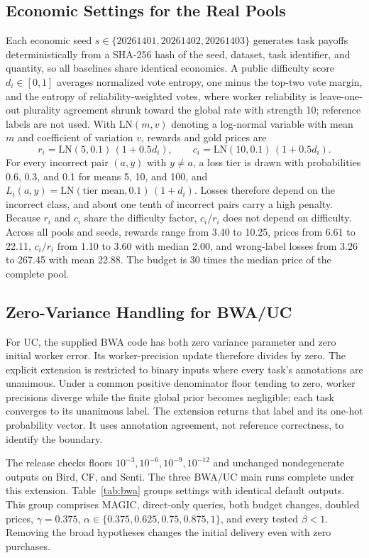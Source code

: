 \documentclass[journal]{IEEEtran}
\begin{document}
\subsection{Economic Settings for the Real Pools}
\label{app:economics}
Each economic seed $s\in\{20261401,20261402,20261403\}$ generates task payoffs deterministically from a SHA-256 hash of the seed, dataset, task identifier, and quantity, so all baselines share identical economics. A public difficulty score $d_i\in[0,1]$ averages normalized vote entropy, one minus the top-two vote margin, and the entropy of reliability-weighted votes, where worker reliability is leave-one-out plurality agreement shrunk toward the global rate with strength 10; reference labels are not used. With $\mathrm{LN}(m,v)$ denoting a log-normal variable with mean $m$ and coefficient of variation $v$, rewards and gold prices are
\begin{equation}
 r_i=\mathrm{LN}(5,0.1)\,(1+0.5d_i),\qquad c_i=\mathrm{LN}(10,0.1)\,(1+0.5d_i).
\end{equation}
For every incorrect pair $(a,y)$ with $y\ne a$, a loss tier is drawn with probabilities 0.6, 0.3, and 0.1 for means 5, 10, and 100, and $L_i(a,y)=\mathrm{LN}(\text{tier mean},0.1)\,(1+d_i)$. Losses therefore depend on the incorrect class, and about one tenth of incorrect pairs carry a high penalty. Because $r_i$ and $c_i$ share the difficulty factor, $c_i/r_i$ does not depend on difficulty. Across all pools and seeds, rewards range from 3.40 to 10.25, prices from 6.61 to 22.11, $c_i/r_i$ from 1.10 to 3.60 with median 2.00, and wrong-label losses from 3.26 to 267.45 with mean 22.88. The budget is $30$ times the median price of the complete pool.


\subsection{Zero-Variance Handling for BWA/UC}
For UC, the supplied BWA code has both zero variance parameter and zero initial worker error. Its worker-precision update therefore divides by zero. The explicit extension is restricted to binary inputs where every task's annotations are unanimous. Under a common positive denominator floor tending to zero, worker precisions diverge while the finite global prior becomes negligible; each task converges to its unanimous label. The extension returns that label and its one-hot probability vector. It uses annotation agreement, not reference correctness, to identify the boundary.

The release checks floors $10^{-3},10^{-6},10^{-9},10^{-12}$ and unchanged nondegenerate outputs on Bird, CF, and Senti. The three BWA/UC main runs complete under this extension. Table~\ref{tab:bwa} groups settings with identical default outputs. This group comprises MAGIC, direct-only queries, both budget changes, doubled prices, $\gamma=0.375$, $\alpha\in\{0.375,0.625,0.75,0.875,1\}$, and every tested $\beta<1$. Removing the broad hypotheses changes the initial delivery even with zero purchases.
\end{document}
